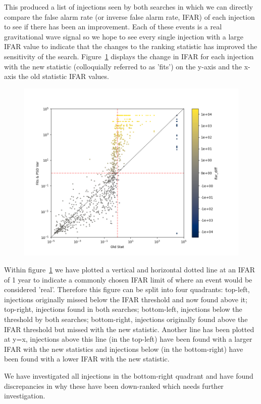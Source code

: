 This produced a list of injections seen by both searches in which we can directly compare the false alarm rate (or inverse false alarm rate, IFAR) of each injection to see if there has been an improvement. Each of these events is a real gravitational wave signal so we hope to see every single injection with a large IFAR value to indicate that the changes to the ranking statistic has improved the sensitivity of the search. Figure~\ref{fig:pycbclive-ifar-vs-ifar} displays the change in IFAR for each injection with the new statistic (colloquially referred to as 'fits') on the y-axis and the x-axis the old statistic IFAR values.
%
\begin{figure}
       \centering
    \includegraphics[width=1.2\textwidth]{images/pycbclive/fits_vs_old_colour.png}
    \caption{}
    \label{fig:pycbclive-ifar-vs-ifar}
\end{figure}
%
Within figure~\ref{fig:pycbclive-ifar-vs-ifar} we have plotted a vertical and horizontal dotted line at an IFAR of 1 year to indicate a commonly chosen IFAR limit of where an event would be considered 'real'. Therefore this figure can be split into four quadrants: top-left, injections originally missed below the IFAR threshold and now found above it; top-right, injections found in both searches; bottom-left, injections below the threshold by both searches; bottom-right, injections originally found above the IFAR threshold but missed with the new statistic. Another line has been plotted at y=x, injections above this line (in the top-left) have been found with a larger IFAR with the new statistics and injections below (in the bottom-right) have been found with a lower IFAR with the new statistic.

We have investigated all injections in the bottom-right quadrant and have found discrepancies in why these have been down-ranked which needs further investigation.


